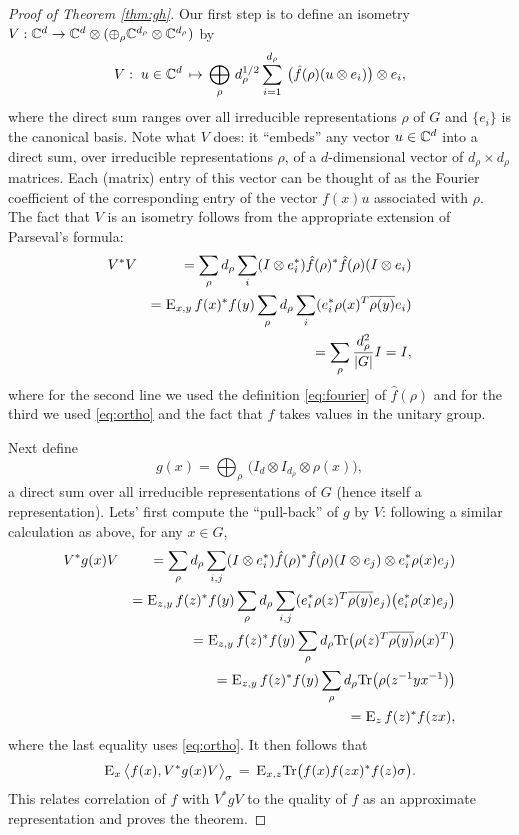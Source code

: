 \begin{proof}[Proof of Theorem \ref{thm:gh}]
Our first step is to define an isometry $V:\mathbb{C}^d \to \mathbb{C}^d \otimes (\oplus_\rho \mathbb{C}^{d_\rho} \otimes \mathbb{C}^{d_\rho})$ by
$$ V :\;u \in \mathbb{C}^d \,\mapsto\, \bigoplus_\rho \,d_\rho^{1/2} \sum_{i=1}^{d_\rho} \,\big(\hat{f}(\rho) (u\otimes e_i)\big) \otimes e_i,$$
where the direct sum ranges over all irreducible representations $\rho$ of $G$ and $\{e_i\}$ is the canonical basis. 
Note what $V$ does: it ``embeds'' any vector $u\in \mathbb{C}^d$ into a direct sum, over irreducible representations $\rho$, of a $d$-dimensional vector of $d_\rho\times d_\rho$ matrices. Each (matrix) entry of this vector can be thought of as the Fourier coefficient of the corresponding entry of the vector $f(x)u$ associated with $\rho$. 
The fact that $V$ is an isometry follows from the appropriate extension of Parseval's formula:  
\begin{eqnarray*}
& V^* V &= \sum_\rho d_\rho \sum_i (I\otimes e_i^*) \hat{f}(\rho)^*\hat{f}(\rho) (I\otimes e_i)\\
&&= \textsc{E}_{x,y}\,  f(x)^*f(y) \sum_\rho d_\rho \sum_i  (e_i^* \rho(x)^T \overline{\rho(y)} e_i)\\
&&= \sum_\rho \frac{d_\rho^2}{|G|}I = I,
\end{eqnarray*}
where for the second line we used the definition \eqref{eq:fourier} of $\hat{f}(\rho)$ and  for the third we used \eqref{eq:ortho} and the fact that $f$ takes values in the unitary group.

Next define
$$g(x) = \bigoplus_\rho \,\big(I_d \otimes I_{d_\rho} \otimes \rho(x)\big), $$
a direct sum over all irreducible representations of $G$ (hence itself a representation). Lets' first compute the ``pull-back'' of $g$ by $V$: following a similar calculation as above, for any $x\in G$, 
\begin{eqnarray*}
& V^*g(x) V  &=  \sum_{\rho}  d_\rho \sum_{i,j} (I\otimes e_i^*)\hat{f}(\rho)^* \hat{f}(\rho)(I\otimes e_j) \otimes e_i^* \rho(x) e_j ) \\
&& =  \textsc{E}_{z,y}\,  f(z)^*f(y)  \sum_{\rho}  d_\rho \sum_{i,j} (e_i^* \rho(z)^T \overline{\rho(y)} e_j) \big( e_i^* \rho(x) e_j \big) \\
&& =  \textsc{E}_{z,y}\,  f(z)^*f(y)  \sum_{\rho}  d_\rho \mathrm{Tr}\big( \rho(z)^T \overline{\rho(y)}  {\rho(x)^T} \big) \\
&& =  \textsc{E}_{z,y}\,  f(z)^*f(y)  \sum_{\rho}  d_\rho \mathrm{Tr}\big( \rho(z^{-1}y x^{-1}) \big) \\
&& =  \textsc{E}_{z}\,  f(z)^*f(zx) , 
\end{eqnarray*}
where the last equality uses \eqref{eq:ortho}.
It then follows that 
\begin{eqnarray*}
\textsc{E}_{x}\, \big\langle f(x), V^*g(x) V \big\rangle_\sigma \,=\,  \textsc{E}_{x,z} \mathrm{Tr}\big( f(x) f(zx)^* f(z)\sigma\big).
\end{eqnarray*}  
This relates correlation of $f$ with $V^*gV$ to the quality of $f$ as an approximate representation and proves the theorem. 
\end{proof}

